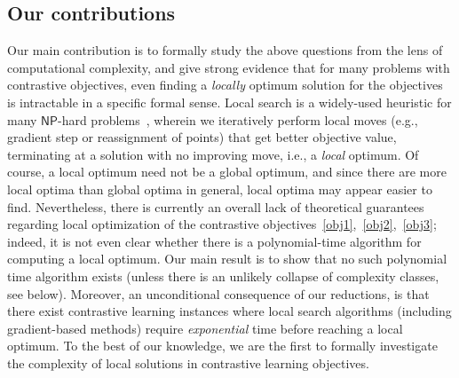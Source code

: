 \documentclass{article}
\theoremstyle{definition}  %
\theoremstyle{plain}
\numberwithin{observation}{section}
\numberwithin{claim}{section}
\numberwithin{fact}{section}
\numberwithin{lemma}{section}
\numberwithin{proposition}{section}
\numberwithin{theorem}{section}
\numberwithin{corollary}{section}
\numberwithin{definition}{section}
\theoremstyle{plain}
\begin{document}
\subsection{Our contributions}



Our main contribution is to formally study the above questions from the lens of computational complexity, and give strong evidence that for many problems with contrastive objectives, even finding a \textit{locally} optimum solution for the objectives is intractable in a specific formal sense. Local search is a widely-used heuristic for many $\mathsf{NP}$-hard problems~\citep{lawler1985traveling,schaffer1991simple,ahuja2002survey,orlin2004approximate}, wherein we iteratively perform local moves (e.g., gradient step or reassignment of points) that get better objective value, terminating at a solution with no improving move, i.e., a \textit{local} optimum.  Of course, a local optimum need not be a global optimum, and since there are more local optima than global optima in general, local optima  may appear  easier to find.  Nevertheless, there is currently an overall lack of theoretical guarantees regarding local optimization of the contrastive objectives~\ref{obj1},~\ref{obj2},~\ref{obj3}; indeed, it is not even clear whether there is a polynomial-time algorithm for computing a local optimum. Our main result is to show that no such polynomial time algorithm exists (unless there is an unlikely collapse of complexity classes, see below). Moreover, an unconditional consequence of our reductions, is that there exist contrastive learning instances where local search algorithms (including gradient-based methods) require \textit{exponential} time before reaching a local optimum. To the best of our knowledge, we are the first to formally investigate the complexity of local solutions in contrastive learning objectives.%






\end{document}
